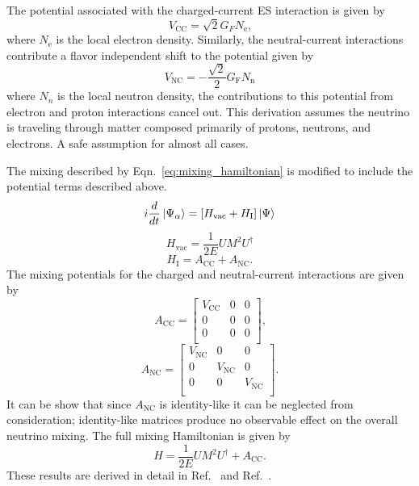 The potential associated with the charged-current ES interaction
is given by
\begin{equation}
V_{\mathrm{CC}} = \sqrt{2}G_{F}N_{\text{e}}\text{,}
\end{equation}
where $N_{\mathrm{e}}$ is the local electron density.
Similarly, the neutral-current interactions contribute a flavor independent
shift to the potential given by
\begin{equation}
V_{\mathrm{NC}} = -\frac{\sqrt{2}}{2} G_{\text{F}} N_{\mathrm{n}}
\end{equation}
where $N_{n}$ is the local neutron density, the contributions to this potential
from electron and proton interactions cancel out.
This derivation assumes the neutrino is traveling through matter composed primarily
of protons, neutrons, and electrons.
 A safe assumption for almost all cases.

The mixing described by Eqn.~\eqref{eq:mixing_hamiltonian} is modified to include
the potential terms described above.
\begin{equation}
i\frac{d}{dt}\ket{\Psi_{\alpha}} = \left[H_{\mathrm{vac}} + H_{\mathrm{I}}\right]\ket{\Psi}
\end{equation}
\begin{equation}
H_{\mathrm{vac}}  = \frac{1}{2E}UM^{2}U^{\dagger}
\end{equation}
\begin{equation}
 H_{\mathrm{I}} =  A_{\mathrm{CC}} + A_{\mathrm{NC}}\text{.}
\end{equation}
The mixing potentials for the charged and neutral-current interactions
are given by
\begin{equation}
A_{\mathrm{CC}} = 
\begin{bmatrix}
    V_{\mathrm{CC}} & 0 & 0  \\
    0 & 0 & 0  \\
    0 & 0 & 0\\
\end{bmatrix}\text{,}
\end{equation}
\begin{equation}
A_{\mathrm{NC}} = 
\begin{bmatrix}
    V_{\mathrm{NC}} & 0 & 0  \\
    0 & V_{\mathrm{NC}} & 0  \\
    0 & 0 & V_{\mathrm{NC}}\\
\end{bmatrix}\text{.}
\end{equation}
It can be show that since $A_{\mathrm{NC}}$ is identity-like it can be neglected
from consideration;
identity-like matrices produce no observable effect on the overall neutrino mixing.
The full mixing Hamiltonian is given by
\begin{equation}
H = \frac{1}{2E}UM^{2}U^{\dagger} + A_{\mathrm{CC}}\text{.}
\end{equation}
These results are derived in detail in Ref.~\cite{wolfenstein_osc} and Ref.~\citep{giuntikim}.

